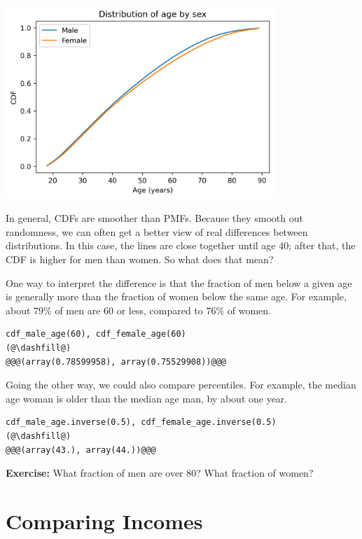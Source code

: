 \begin{center}
\includegraphics[width=4in]{chapters/08_distributions_files/08_distributions_90_0.png}
\end{center}

In general, CDFs are smoother than PMFs. Because they smooth out
randomness, we can often get a better view of real differences between
distributions. In this case, the lines are close together until age 40;
after that, the CDF is higher for men than women. So what does that
mean?

One way to interpret the difference is that the fraction of men below a
given age is generally more than the fraction of women below the same
age. For example, about 79\% of men are 60 or less, compared to 76\% of
women.

\begin{lstlisting}[]
cdf_male_age(60), cdf_female_age(60)
(@\dashfill@)
@@@(array(0.78599958), array(0.75529908))@@@
\end{lstlisting}

Going the other way, we could also compare percentiles. For example, the
median age woman is older than the median age man, by about one year.

\begin{lstlisting}[]
cdf_male_age.inverse(0.5), cdf_female_age.inverse(0.5)
(@\dashfill@)
@@@(array(43.), array(44.))@@@
\end{lstlisting}

\textbf{Exercise:} What fraction of men are over 80? What fraction of
women?

\hypertarget{comparing-incomes}{%
\section{Comparing Incomes}\label{comparing-incomes}}

